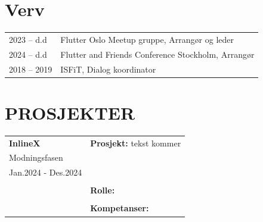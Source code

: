 \documentclass[a4paper,10pt]{article}
\begin{document}
\section{Verv}
\begin{tabularx}{\linewidth}{@{}lX@{}}
2023 -- d.d & Flutter Oslo Meetup gruppe, Arrangør og leder \\
2024 -- d.d & Flutter and Friends Conference Stockholm, Arrangør \\
2018 -- 2019 & ISFiT, Dialog koordinator \\
\end{tabularx}
\vspace{1em}

\section{{\Huge \ubuntu PROSJEKTER}}

\noindent
\begin{tabular}{@{}p{4cm}p{11cm}@{}}  %
\textbf{InlineX}
& \textbf{Prosjekt:} tekst kommer \\
Modningsfasen & \\
Jan.2024 - Des.2024 & \\
& \\
&  \textbf{Rolle:} \\
& \\
& \textbf{Kompetanser:} \\
\end{tabular}



\vspace{2em}
\end{document}
